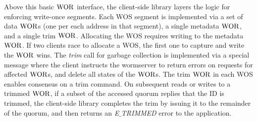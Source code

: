 Above this basic $\mathrm{WOR}$ interface, the client-side library layers the logic for enforcing write-once segments. Each WOS segment is implemented via a set of data $\mathrm{WOR}$s (one per each address in that segment), a single metadata $\mathrm{WOR}$, and a single trim $\mathrm{WOR}$. Allocating the WOS requires writing to the metadata $\mathrm{WOR}$. If two clients race to allocate a WOS, the first one to capture and write the $\mathrm{WOR}$ wins.
The \textit{trim} call for garbage collection is implemented via a special message where the client instructs the wormserver to return errors on requests for affected $\mathrm{WOR}$s, and delete all states of the $\mathrm{WOR}$s. The trim $\mathrm{WOR}$ in each WOS enables consensus on a trim command. On subsequent reads or writes to a trimmed $\mathrm{WOR}$, if a subset of the accessed quorum replies that the ID is trimmed, the client-side library completes the trim by issuing it to the remainder of the quorum, and then returns an \textit{E$\_$TRIMMED} error to the application.

%
%
%
%

